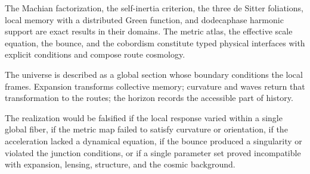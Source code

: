 \begin{resultado}
The Machian factorization, the self-inertia criterion, the three de Sitter
foliations, local memory with a distributed Green function, and dodecaphase
harmonic support are exact results in their domains. The metric atlas, the
effective scale equation, the bounce, and the cobordism constitute typed
physical interfaces with explicit conditions and compose route cosmology.
\end{resultado}

\begin{lecturafisica}
The universe is described as a global section whose boundary conditions the
local frames. Expansion transforms collective memory; curvature and
waves return that transformation to the routes; the horizon records the
accessible part of history.
\end{lecturafisica}

\begin{frontera}
The realization would be falsified if the local response varied within a single global fiber, if the metric map failed to satisfy curvature or orientation, if the acceleration lacked a dynamical equation, if the bounce produced a singularity or violated the junction conditions, or if a single parameter set proved incompatible with expansion, lensing, structure, and the cosmic background.
\end{frontera}
